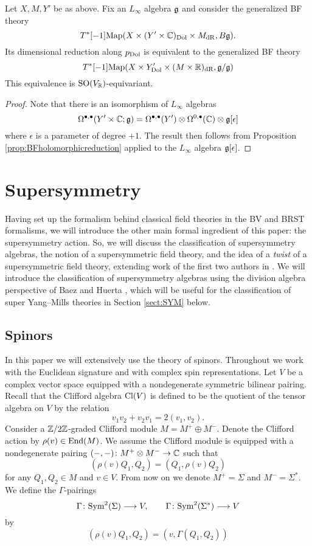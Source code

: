 \documentclass[10pt, oneside]{article}
\begin{document}
\begin{prop}
\label{prop:BFdolbeaultreduction}
Let $X, M, Y'$ be as above.
Fix an $L_\infty$ algebra $\mathfrak g$ and consider the generalized BF theory
\[
T^*[-1] {\rm Map}(X \times (Y' \times \mathbb C)_{\rm Dol} \times M_{\rm dR} , B \mathfrak g) .
\]
Its dimensional reduction along $p_{\rm Dol}$ is equivalent to the generalized BF theory
\[
T^*[-1] {\rm Map} (X \times Y'_{\rm Dol} \times (M \times \mathbb R)_{\rm dR}, \mathfrak g / \mathfrak g)
\]
This equivalence is $\mathrm{SO}(V_\mathbb R)$-equivariant.
\end{prop}
\begin{proof}
Note that there is an isomorphism of $L_\infty$ algebras
\[
\Omega^{\bullet, \bullet} (Y' \times \mathbb C ; \mathfrak g) = \Omega^{\bullet,\bullet}(Y') \otimes \Omega^{0,\bullet}(\mathbb C) \otimes \mathfrak g[\epsilon]
\]
where $\epsilon$ is a parameter of degree $+1$.
The result then follows from Proposition \ref{prop:BFholomorphicreduction} applied to the $L_\infty$ algebra $\mathfrak g[\epsilon]$. 
\end{proof}

\section{Supersymmetry} \label{sect:susy}
Having set up the formalism behind classical field theories in the BV and BRST formalisms, we will introduce the other main formal ingredient of this paper: the supersymmetry action.  So, we will discuss the classification of supersymmetry algebras, the notion of a supersymmetric field theory, and the idea of a \emph{twist} of a supersymmetric field theory, extending work of the first two authors in \cite{ElliottSafronov}.  We will introduce the classification of supersymmetry algebras using the division algebra perspective of Baez and Huerta \cite{BaezHuerta}, which will be useful for the classification of super Yang--Mills theories in Section \ref{sect:SYM} below.

\subsection{Spinors}
\label{sect:spinors}

In this paper we will extensively use the theory of spinors. 
Throughout we work with the Euclidean signature and with complex spin representations. 
Let $V$ be a complex vector space equipped with a nondegenerate symmetric bilinear pairing. Recall that the Clifford algebra $\mathrm{Cl}(V)$ is defined to be the quotient of the tensor algebra on $V$ by the relation
\[v_1 v_2 + v_2 v_1 = 2(v_1, v_2).\]
Consider a $\mathbb Z/2\mathbb Z$-graded Clifford module $M=M^+\oplus M^-$. Denote the Clifford action by $\rho(v)\in\operatorname{End}(M)$. We assume the Clifford module is equipped with a nondegenerate pairing $(-, -)\colon M^+\otimes M^-\rightarrow \mathbb C$ such that
\[(\rho(v) Q_1, Q_2) = (Q_1, \rho(v) Q_2)\]
for any $Q_1, Q_2\in M$ and $v\in V$. From now on we denote $M^+=\Sigma$ and $M^-=\Sigma^*$. We define the $\Gamma$-pairings
\[\Gamma\colon{\rm Sym}^2(\Sigma)\longrightarrow V,\qquad \Gamma\colon{\rm Sym}^2(\Sigma^*)\longrightarrow V\]
by
\begin{equation}
(\rho(v) Q_1, Q_2) = (v, \Gamma(Q_1, Q_2))
\label{eq:Gammaspinorpairing}
\end{equation}
\end{document}
